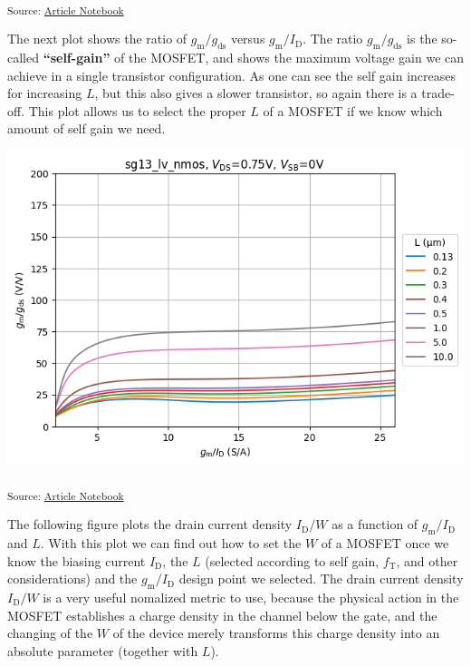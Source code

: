 \documentclass[
  a4paper,
  DIV=11,
  numbers=noendperiod]{scrartcl}
\begin{document}
\textsubscript{Source:
\href{https://iic-jku.github.io/analog-circuit-design/index.qmd.html}{Article
Notebook}}

The next plot shows the ratio of \(g_\mathrm{m}/ g_\mathrm{ds}\) versus
\(g_\mathrm{m}/I_\mathrm{D}\). The ratio \(g_\mathrm{m}/ g_\mathrm{ds}\)
is the so-called \textbf{``self-gain''} of the MOSFET, and shows the
maximum voltage gain we can achieve in a single transistor
configuration. As one can see the self gain increases for increasing
\(L\), but this also gives a slower transistor, so again there is a
trade-off. This plot allows us to select the proper \(L\) of a MOSFET if
we know which amount of self gain we need.

\includegraphics{index_files/figure-latex/.-sizing-techsweep_sg13_plots_nmos-cell-10-output-1.png}

\textsubscript{Source:
\href{https://iic-jku.github.io/analog-circuit-design/index.qmd.html}{Article
Notebook}}

The following figure plots the drain current density \(I_\mathrm{D}/W\)
as a function of \(g_\mathrm{m}/I_\mathrm{D}\) and \(L\). With this plot
we can find out how to set the \(W\) of a MOSFET once we know the
biasing current \(I_\mathrm{D}\), the \(L\) (selected according to self
gain, \(f_\mathrm{T}\), and other considerations) and the
\(g_\mathrm{m}/I_\mathrm{D}\) design point we selected. The drain
current density \(I_\mathrm{D}/W\) is a very useful nomalized metric to
use, because the physical action in the MOSFET establishes a charge
density in the channel below the gate, and the changing of the \(W\) of
the device merely transforms this charge density into an absolute
parameter (together with \(L\)).
\end{document}
